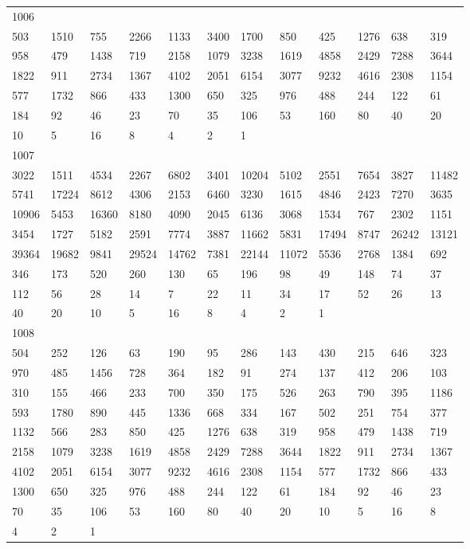\begin{longtable}{llllllllllll}
1006&&&&&&&&&&&\\
503& 1510& 755& 2266& 1133& 3400& 1700& 850& 425& 1276& 638& 319\\
958& 479& 1438& 719& 2158& 1079& 3238& 1619& 4858& 2429& 7288& 3644\\
1822& 911& 2734& 1367& 4102& 2051& 6154& 3077& 9232& 4616& 2308& 1154\\
577& 1732& 866& 433& 1300& 650& 325& 976& 488& 244& 122& 61\\
184& 92& 46& 23& 70& 35& 106& 53& 160& 80& 40& 20\\
10& 5& 16& 8& 4& 2& 1& \\

1007&&&&&&&&&&&\\
3022& 1511& 4534& 2267& 6802& 3401& 10204& 5102& 2551& 7654& 3827& 11482\\
5741& 17224& 8612& 4306& 2153& 6460& 3230& 1615& 4846& 2423& 7270& 3635\\
10906& 5453& 16360& 8180& 4090& 2045& 6136& 3068& 1534& 767& 2302& 1151\\
3454& 1727& 5182& 2591& 7774& 3887& 11662& 5831& 17494& 8747& 26242& 13121\\
39364& 19682& 9841& 29524& 14762& 7381& 22144& 11072& 5536& 2768& 1384& 692\\
346& 173& 520& 260& 130& 65& 196& 98& 49& 148& 74& 37\\
112& 56& 28& 14& 7& 22& 11& 34& 17& 52& 26& 13\\
40& 20& 10& 5& 16& 8& 4& 2& 1& \\

1008&&&&&&&&&&&\\
504& 252& 126& 63& 190& 95& 286& 143& 430& 215& 646& 323\\
970& 485& 1456& 728& 364& 182& 91& 274& 137& 412& 206& 103\\
310& 155& 466& 233& 700& 350& 175& 526& 263& 790& 395& 1186\\
593& 1780& 890& 445& 1336& 668& 334& 167& 502& 251& 754& 377\\
1132& 566& 283& 850& 425& 1276& 638& 319& 958& 479& 1438& 719\\
2158& 1079& 3238& 1619& 4858& 2429& 7288& 3644& 1822& 911& 2734& 1367\\
4102& 2051& 6154& 3077& 9232& 4616& 2308& 1154& 577& 1732& 866& 433\\
1300& 650& 325& 976& 488& 244& 122& 61& 184& 92& 46& 23\\
70& 35& 106& 53& 160& 80& 40& 20& 10& 5& 16& 8\\
4& 2& 1& \\


\end{longtable}
